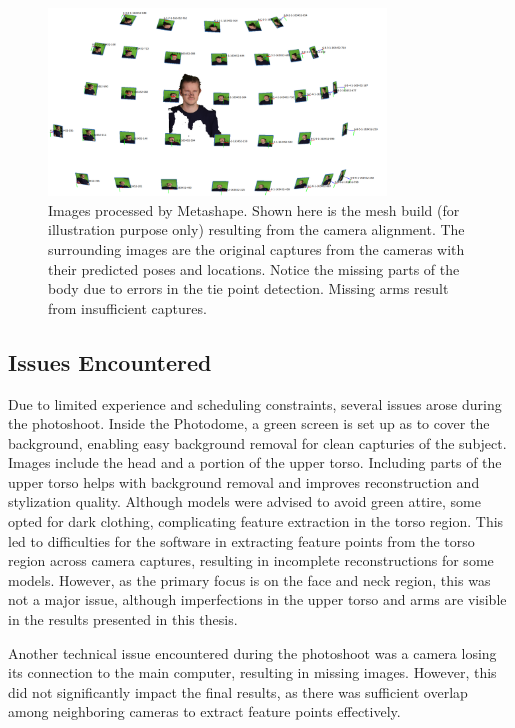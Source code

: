 \begin{figure}[h]
	\centering
	\includegraphics[width=0.8\textwidth]{Figures/methods/metashape.png}
	\caption{Images processed by Metashape. Shown here is the mesh build (for illustration purpose only) resulting from the camera alignment. The surrounding images are the original captures from the cameras with their predicted poses and locations. Notice the missing parts of the body due to errors in the tie point detection. Missing arms result from insufficient captures.}
\end{figure}

\subsection{Issues Encountered}
Due to limited experience and scheduling constraints, several issues arose during the photoshoot. Inside the Photodome, a green screen is set up as to cover the background, enabling easy background removal for clean capturies of the subject. Images include the head and a portion of the upper torso. Including parts of the upper torso helps with background removal and improves reconstruction and stylization quality. Although models were advised to avoid green attire, some opted for dark clothing, complicating feature extraction in the torso region. This led to difficulties for the software in extracting feature points from the torso region across camera captures, resulting in incomplete reconstructions for some models. However, as the primary focus is on the face and neck region, this was not a major issue, although imperfections in the upper torso and arms are visible in the results presented in this thesis.

Another technical issue encountered during the photoshoot was a camera losing its connection to the main computer, resulting in missing images. However, this did not significantly impact the final results, as there was sufficient overlap among neighboring cameras to extract feature points effectively.

